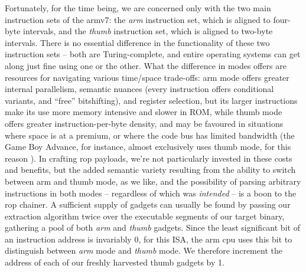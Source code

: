 \documentclass[12pt,glossary]{dalthesis}
\begin{document}
Fortunately, for the time being, we are concerned only with the two main
instruction sets of the \gls{armv7}: the \emph{arm} instruction set, which is aligned
to four-byte intervals, and the \emph{thumb} instruction set, which is aligned to
two-byte intervals. There is no essential difference in the functionality of
these two instruction sets -- both are Turing-complete, and entire operating
systems can get along just fine using one or the other. What the difference in
modes offers are resources for navigating various time/space trade-offs: arm
mode offers greater internal parallelism, semantic nuances (every instruction
offers conditional variants, and ``free'' bitshifting), and register selection,
but its larger instructions make its use more memory intensive and slower in
ROM, while thumb mode offers greater instruction-per-byte density, and may be
favoured in situations where space is at a premium, or where the code bus has
limited bandwidth (the Game Boy Advance, for instance, almost exclusively uses
thumb mode, for this reason \cite{gbaguy} \cite{coranac}). In crafting \gls{rop}
payloads, we're not particularly invested in these costs and benefits, but the
added semantic variety resulting from the ability to switch between \gls{arm} and
\gls{thumb} mode, as we like, and the possibility of parsing arbitrary
instructions in both modes -- regardless of which was \emph{intended} -- is a boon to
the \gls{rop} chainer. A sufficient supply of gadgets can usually be found by
passing our extraction algorithm twice over the executable segments of our
target binary, gathering a pool of both \emph{arm} and \emph{thumb} gadgets. Since the
least significant bit of an instruction address is invariably 0, for this ISA,
the \gls{arm} \gls{cpu} uses this bit to distinguish between \emph{arm} mode and \emph{thumb}
mode. We therefore increment the address of each of our freshly harvested thumb
gadgets by 1.
\end{document}
